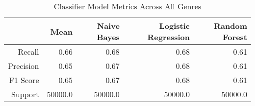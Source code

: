 \begin{table}[h]
    \centering
    \begin{tabular}{r|r|r|r|r}
         & Mean & Naive Bayes & Logistic Regression & Random Forest \\\hline
        Recall     & 0.66 & 0.68 & 0.68 & 0.61 \\
        Precision  & 0.65 & 0.67 & 0.68 & 0.61 \\
        F1 Score   & 0.65 & 0.67 & 0.68 & 0.61 \\
        Support    & 50000.0 & 50000.0 & 50000.0 & 50000.0
\end{tabular}
    \caption{Classifier Model Metrics Across All Genres}
    \label{tab:mode_aggregation_metrics_table}
\end{table}